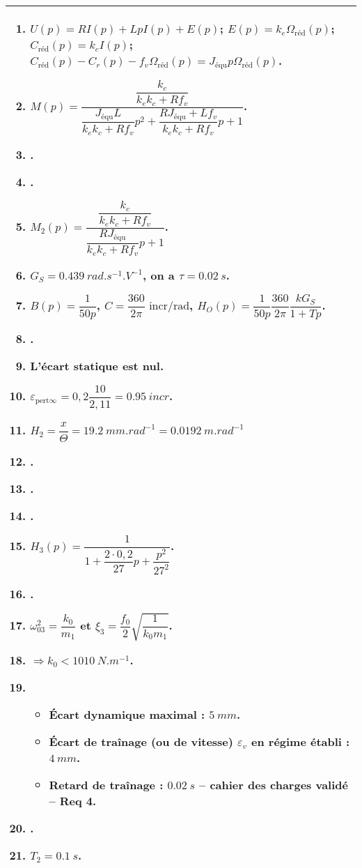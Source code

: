 \begin{tabular}{|p{.95\linewidth}|}
\hline
 \begin{enumerate} 
 \item $U(p) = R I(p) + LpI(p)+ E(p)$; $E(p) = k_e  \Omega_{\text{réd}}(p)$; $C_{\text{réd}} (p)= k_c  I(p)$;
 $C_{\text{réd}} (p) - C_r(p) - f_v \Omega_{\text{réd}}(p)= J_{\text{équ}}  p \Omega_{\text{réd}}(p)$. 
 \item $ M(p)=\dfrac{\dfrac{k_c}{k_e k_c+Rf_v}}{  \dfrac{ J_{\text{équ}}   L}{k_e k_c+Rf_v}p^2 +\dfrac{ RJ_{\text{équ}}    +  L f_v}{k_e k_c+Rf_v}p +1 }$.
 \item .
 \item .
 \item $  M_2(p)=\dfrac{\dfrac{k_c}{k_e k_c+Rf_v}}{  \dfrac{ RJ_{\text{équ}}  }{k_e k_c+Rf_v}p +1 }$.
 \item $G_S = \SI{0,439}{rad.s^{-1}.V^{-1}} $, on a $\tau = \SI{0,02}{s}$.
 \item $B(p)=\dfrac{1}{50p}$, $C=\dfrac{360}{2\pi}\text{ incr/rad} $, $H_O(p)=\dfrac{1}{50p}\dfrac{360}{2\pi} \dfrac{kG_S}{1+Tp}$.
 \item .
 \item L'écart statique est nul.
 \item $\varepsilon_{\text{pert} \infty} = 0,2 \dfrac{ 10}{2,1   1 } =\SI{0,95}{incr}$.
 \item $H_2 =\dfrac{x}{\Theta}=\SI{19,2}{mm.rad^{-1}}=\SI{0,0192}{m.rad^{-1}}$
 \item .
 \item .
 \item .
 \item $H_3(p)=\dfrac{1}{1+\dfrac{2\cdot 0,2}{27}p+\dfrac{p^2}{27^2}}$.
 \item .
 \item $\omega_{03}^2=\dfrac{k_0}{m_1}$ et $\xi_3 =\dfrac{f_0}{2}\sqrt {\dfrac{1}{k_0m_1}}$.
 \item $\Rightarrow k_0 <\SI{1010}{N.m^{-1}}$.
 \item \begin{itemize}
\item Écart dynamique maximal : $\SI{5}{mm}$.
\item Écart de traînage (ou de vitesse) $\varepsilon_v$ en régime établi : $\SI{4}{mm}$.
\item Retard de traînage : $\SI{0,02}{s}$ -- cahier des charges validé -- Req 4.
\end{itemize}
\item .
\item $T_2 = \SI{0,1}{s}$.
\end{enumerate}\\
\hline
\end{tabular}
%
%
%
%
%
%

